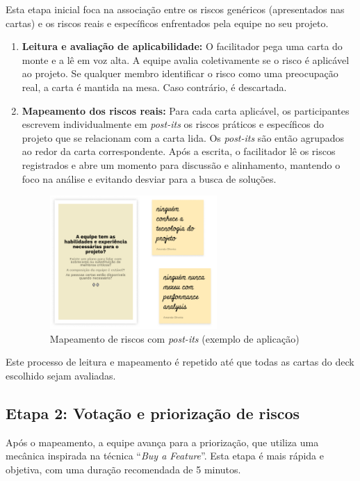 \documentclass[
	12pt,
	openright,
	twoside,
	a4paper,
	english,
	brazil
	]{abntex2}
\begin{document}
Esta etapa inicial foca na associação entre os riscos genéricos (apresentados nas cartas) e os riscos reais e específicos enfrentados pela equipe no seu projeto.

\begin{enumerate}
  \item \textbf{Leitura e avaliação de aplicabilidade:} O facilitador pega uma carta do monte e a lê em voz alta. A equipe avalia coletivamente se o risco é aplicável ao projeto. Se qualquer membro identificar o risco como uma preocupação real, a carta é mantida na mesa. Caso contrário, é descartada.
  \item \textbf{Mapeamento dos riscos reais:} Para cada carta aplicável, os participantes escrevem individualmente em \textit{post-its} os riscos práticos e específicos do projeto que se relacionam com a carta lida. Os \textit{post-its} são então agrupados ao redor da carta correspondente. Após a escrita, o facilitador lê os riscos registrados e abre um momento para discussão e alinhamento, mantendo o foco na análise e evitando desviar para a busca de soluções.
  \begin{figure}[H]
      \centering
      \caption{\label{mapeamento-riscos-postits} Mapeamento de riscos com \textit{post-its} (exemplo de aplicação)}
      \includegraphics[width=0.6\textwidth]{mapeamento-riscos-postits}
  \end{figure}
\end{enumerate}
Este processo de leitura e mapeamento é repetido até que todas as cartas do deck escolhido sejam avaliadas.

\subsection{Etapa 2: Votação e priorização de riscos}
\label{sec:priorizacao-riscos-cap5}

Após o mapeamento, a equipe avança para a priorização, que utiliza uma mecânica inspirada na técnica “\textit{Buy a Feature}”. Esta etapa é mais rápida e objetiva, com uma duração recomendada de 5 minutos.
\end{document}
